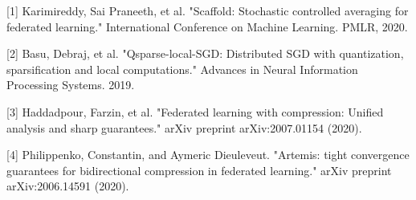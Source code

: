 \documentclass{article}
\begin{document}
[1] Karimireddy, Sai Praneeth, et al. "Scaffold: Stochastic controlled averaging for federated learning." International Conference on Machine Learning. PMLR, 2020.\vspace{-1.95pt} 

[2] Basu, Debraj, et al. "Qsparse-local-SGD: Distributed SGD with quantization, sparsification and local computations." Advances in Neural Information Processing Systems. 2019.\vspace{-1.95pt} 

[3] Haddadpour, Farzin, et al. "Federated learning with compression: Unified analysis and sharp guarantees." arXiv preprint arXiv:2007.01154 (2020).\vspace{-1.95pt} 

[4] Philippenko, Constantin, and Aymeric Dieuleveut. "Artemis: tight convergence guarantees for bidirectional compression in federated learning." arXiv preprint arXiv:2006.14591 (2020).
\end{document}
